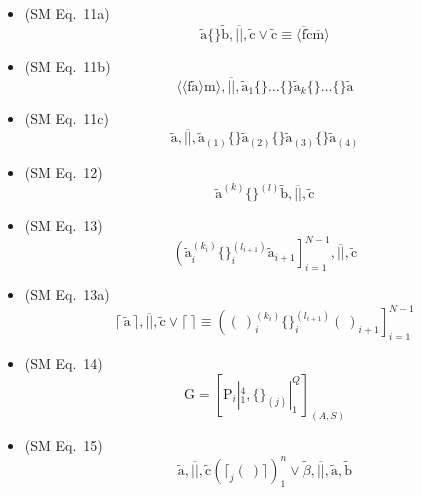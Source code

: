 \documentclass[12pt]{article}
\begin{document}
\begin{itemize}[label={},leftmargin=0pt]
    \item (SM Eq.\ 11a) 
    \[
    \tilde{\mathrm{a}} \{ \} \tilde{\mathrm{b}}, \overline{||}, \tilde{\mathrm{c}} \lor \tilde{\mathrm{c}} \equiv \langle \overline{\mathrm{f}} \tilde{\mathrm{c}} \overline{\mathrm{m}} \rangle
    \]

    \item (SM Eq.\ 11b) 
    \[
    \langle\langle \mathrm{f} \tilde{\mathrm{a}} \rangle \mathrm{m} \rangle, \overline{||}, \tilde{\mathrm{a}}_1 \{ \} \dots \{ \} \tilde{\mathrm{a}}_k \{ \} \dots \{ \} \tilde{\mathrm{a}}
    \]

    \item (SM Eq.\ 11c) 
    \[
    \tilde{\mathrm{a}}, \overline{||}, \tilde{\mathrm{a}}_{(1)} \{ \} \tilde{\mathrm{a}}_{(2)} \{ \} \tilde{\mathrm{a}}_{(3)} \{ \} \tilde{\mathrm{a}}_{(4)}
    \]

    \item (SM Eq.\ 12) 
    \[
    \tilde{\mathrm{a}}^{(k)} \{ \}^{(l)} \tilde{\mathrm{b}}, \overline{||}, \tilde{\mathrm{c}}
    \]

    \item (SM Eq.\ 13) 
    \[
    \left( \tilde{\mathrm{a}}_i^{(k_i)} \{ \}_i^{(l_{i+1})} \tilde{\mathrm{a}}_{i+1} \right]_{i=1}^{N-1}, \overline{||}, \tilde{\mathrm{c}}
    \]

    \item (SM Eq.\ 13a) 
    \[
    \lceil \, \tilde{\mathrm{a}} \, \rceil, \overline{||}, \tilde{\mathrm{c}} \lor \lceil \ \rceil \equiv \left( (\ )_i^{(k_i)} \{ \}_i^{(l_{i+1})} (\ )_{i+1} \right]_{i=1}^{N-1}
    \]

    \item (SM Eq.\ 14) 
    \[
    \mathrm{G} = \left[ \mathrm{P}_i |_1^4, \{ \}_{(j)} |_1^Q \right]_{(A, S)}
    \]

    \item (SM Eq.\ 15) 
    \[
    \tilde{\mathrm{a}}, \overline{||}, \tilde{\mathrm{c}} \left( \lceil_j (\ ) \rceil \right)_1^n \lor \tilde{\beta}, \overline{||}, \tilde{\mathrm{a}}, \tilde{\mathrm{b}}
    \]


\end{itemize}
\end{document}
